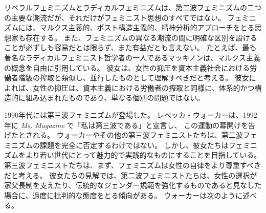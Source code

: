 \documentclass[paper=a4,book,openany]{jlreq}
\begin{document}
リベラルフェミニズムとラディカルフェミニズムは、第二波フェミニズムの二つの主要な潮流だが、それだけがフェミニスト思想のすべてではない。
フェミニズムには、マルクス主義的、ポスト構造主義的、精神分析的アプローチをとる思想家も存在する。
また、フェミニズムの異なる潮流の間に明確な区別を設けることが必ずしも容易だとは限らず、また有益だとも言えない。
たとえば、最も著名なラディカルフェミニスト哲学者の一人であるマッキノンは、マルクス主義の概念を自由に引用している。
彼女は、女性の抑圧を資本主義社会における労働者階級の搾取と類似し、並行したものとして理解すべきだと考える。
彼女によれば、女性の抑圧は、資本主義における労働者の搾取と同様に、体系的かつ構造的に組み込まれたものであり、単なる個別の問題ではない\citep[p.515]{mackinnon82:_femin_marx_meth_stat}。

1990年代には第三波フェミニズムが登場した\citep[cf.][]{snyder08:_what_is_thir_wave_femin}。
レベッカ・ウォーカーは、1992年に \emph{Ms. Magazine} で「私は第三波である」と宣言し\citep{walker92:_becom_thir_wave}、
この運動の幕開けを告げたとされる。
ウォーカーやその他の第三波フェミニストたちは、第二波フェミニズムの課題を完全に否定するわけではない。
しかし、彼女たちはフェミニズムをより若い世代にとって魅力的で実践的なものにすることを目指している。
第三波フェミニストたちは、まず、フェミニズムは女性の自律をより尊重すべきだと考える。
彼女たちの見解では、第二波フェミニストたちは、女性の選択が家父長制を支えたり、伝統的なジェンダー規範を強化するものであると見なした場合に、過度に批判的な態度をとる傾向がある\citep[p.xxii]{hernández02:_colon_this}。
ウォーカーは次のように述べる。
\end{document}
